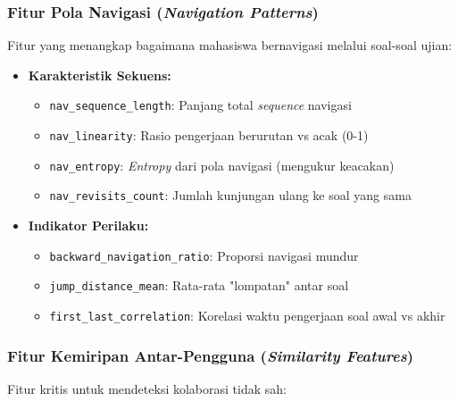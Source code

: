 \subsubsection{Fitur Pola Navigasi (\textit{Navigation Patterns})}
\label{sec:fiturPolaNavigasi}

Fitur yang menangkap bagaimana mahasiswa bernavigasi melalui soal-soal ujian:

\begin{itemize}
    \item \textbf{Karakteristik Sekuens:}
    \begin{itemize}
        \item \texttt{nav\_sequence\_length}: Panjang total \textit{sequence} navigasi
        \item \texttt{nav\_linearity}: Rasio pengerjaan berurutan vs acak (0-1)
        \item \texttt{nav\_entropy}: \textit{Entropy} dari pola navigasi (mengukur keacakan)
        \item \texttt{nav\_revisits\_count}: Jumlah kunjungan ulang ke soal yang sama
    \end{itemize}
    
    \item \textbf{Indikator Perilaku:}
    \begin{itemize}
        \item \texttt{backward\_navigation\_ratio}: Proporsi navigasi mundur
        \item \texttt{jump\_distance\_mean}: Rata-rata "lompatan" antar soal
        \item \texttt{first\_last\_correlation}: Korelasi waktu pengerjaan soal awal vs akhir
    \end{itemize}
\end{itemize}

\subsubsection{Fitur Kemiripan Antar-Pengguna (\textit{Similarity Features})}
\label{sec:fiturKemiripan}

Fitur kritis untuk mendeteksi kolaborasi tidak sah:

